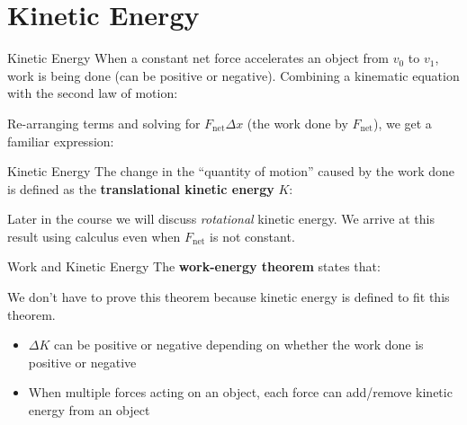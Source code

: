 \documentclass[12pt,compress,aspectratio=169]{beamer}
\begin{document}
\section{Kinetic Energy}

\begin{frame}{Kinetic Energy}
  When a constant net force accelerates an object from $v_0$ to $v_1$, work is
  being done (can be positive or negative). Combining a kinematic equation with
  the second law of motion:


  Re-arranging terms and solving for $F_\text{net}\Delta x$ (the work done by
  $F_\text{net}$), we get a familiar expression:

\end{frame}



\begin{frame}{Kinetic Energy}
  The change in the ``quantity of motion'' caused by the work done is defined
  as the \textbf{translational kinetic energy} $K$:


  Later in the course we will discuss \emph{rotational} kinetic energy.
  We arrive at this result using calculus even when $F_\text{net}$ is not
  constant.
\end{frame}



\begin{frame}{Work and Kinetic Energy}
  The \textbf{work-energy theorem} states that:


  We don't have to prove this theorem because kinetic energy is defined to
  fit this theorem.
  \begin{itemize}
  \item $\Delta K$ can be positive or negative depending on whether the work
    done is positive or negative
  \item When multiple forces acting on an object, each force can add/remove
    kinetic energy from an object
  \end{itemize}
\end{frame}
\end{document}
